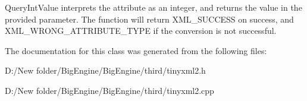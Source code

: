 Query\+Int\+Value interprets the attribute as an integer, and returns the value in the provided parameter. The function will return X\+M\+L\+\_\+\+S\+U\+C\+C\+E\+SS on success, and X\+M\+L\+\_\+\+W\+R\+O\+N\+G\+\_\+\+A\+T\+T\+R\+I\+B\+U\+T\+E\+\_\+\+T\+Y\+PE if the conversion is not successful. 

The documentation for this class was generated from the following files\+:\begin{DoxyCompactItemize}
\item 
D\+:/\+New folder/\+Big\+Engine/\+Big\+Engine/third/tinyxml2.\+h\item 
D\+:/\+New folder/\+Big\+Engine/\+Big\+Engine/third/tinyxml2.\+cpp\end{DoxyCompactItemize}
